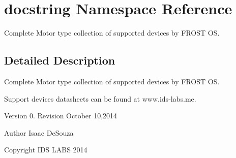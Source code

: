 \hypertarget{namespacedocstring}{}\section{docstring Namespace Reference}
\label{namespacedocstring}


Complete Motor type collection of supported devices by F\+R\+O\+S\+T O\+S.  




\subsection{Detailed Description}
Complete Motor type collection of supported devices by F\+R\+O\+S\+T O\+S. 

Support devices datasheets can be found at www.\+ids-\/labs.\+me.

Version 0. Revision October 10,2014

\begin{DoxyAuthor}{Author}
Isaac De\+Souza 
\end{DoxyAuthor}
\begin{DoxyCopyright}{Copyright}
I\+D\+S L\+A\+B\+S 2014 
\end{DoxyCopyright}
